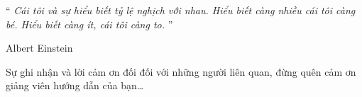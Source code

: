 \documentclass[
12pt,
oneside,
english,
doublespacing,
nolistspacing,
liststotoc,
parskip,
headsepline,
chapterinoneline,
]{HUSdissertation}
\author{Tên sinh viên thực hiện} 			%
\begin{document}
\lstset{style=codeC}	%

\frontmatter 			%

\pagestyle{plain} 


%







\vspace*{0.2\textheight}

\noindent\enquote{\itshape 
	Cái tôi và sự hiểu biết tỷ lệ nghịch với nhau. Hiểu biết càng nhiều cái tôi càng bé. Hiểu biết càng ít, cái tôi càng to.
}\bigbreak

\hfill Albert Einstein



\begin{acknowledgements}
	\addchaptertocentry{\acknowledgementname}
	\thispagestyle{empty}
	Sự ghi nhận và lời cảm ơn đối đối với những người liên quan, đừng quên cảm ơn giảng viên hướng dẫn của bạn\ldots
\end{acknowledgements}


%

\begin{spacing}{1.15}
	\tableofcontents 	%
\end{spacing}

\begin{spacing}{1.15}
	\listoffigures 		%
\end{spacing}
\end{document}
